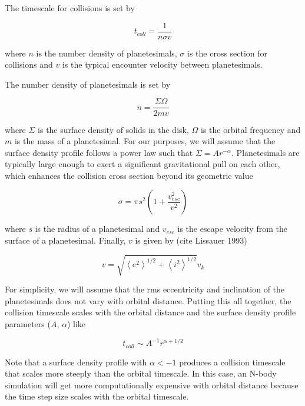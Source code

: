 \documentclass[onecolumn]{aastex63}
\begin{document}
The timescale for collisions is set by

\begin{equation}
	t_{coll} = \frac{1}{n \sigma v}
\end{equation}

\noindent where $n$ is the number density of planetesimals, $\sigma$ is the cross section for collisions and $v$ is the typical encounter velocity between planetesimals. 

The number density of planetesimals is set by

\begin{equation}
    n = \frac{\Sigma \Omega}{2 m v}
\end{equation}

\noindent where $\Sigma$ is the surface density of solids in the disk, $\Omega$ is the orbital frequency and $m$ is the mass of a planetesimal. For our purposes, we will assume that the surface density profile follows a power law such that $\Sigma = A r^{-\alpha}$. Planetesimals are typically large enough to exert a significant gravitational pull on each other, which enhances the collision cross section beyond its geometric value

\begin{equation}
	\sigma = \pi s^{2} \left( 1 + \frac{v_{esc}^{2}}{v^{2}} \right)
\end{equation}

\noindent where $s$ is the radius of a planetesimal and $v_{esc}$ is the escape velocity from the surface of a planetesimal. Finally, $v$ is given by (cite Lissauer 1993)

\begin{equation}
	v = \sqrt{\left<  e^{2} \right>^{1/2} + \left< i^{2} \right>^{1/2}} v_{k}
\end{equation}

\noindent For simplicity, we will assume that the rms eccentricity and inclination of the planetesimals does not vary with orbital distance. Putting this all together, the collision timescale scales with the orbital distance and the surface density profile parameters ($A$, $\alpha$) like

\begin{equation}
	t_{coll} \sim A^{-1} r^{\alpha + 1/2}
\end{equation}

Note that a surface density profile with $\alpha < -1$ produces a collision timescale that scales more steeply than the orbital timescale. In this case, an N-body simulation will get more computationally expensive with orbital distance because the time step size scales with the orbital timescale.
\end{document}
